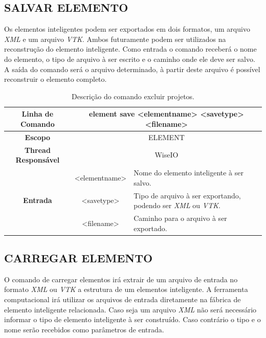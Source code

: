 \subsection{SALVAR ELEMENTO}\label{sec:save_element}

Os elementos inteligentes podem ser exportados em dois formatos, um arquivo \textit{XML} e um arquivo \textit{VTK}. Ambos futuramente podem ser utilizados na reconstrução do elemento inteligente. Como entrada o comando receberá o nome do elemento, o tipo de arquivo à ser escrito e o caminho onde ele deve ser salvo. A saída do comando será o arquivo determinado, à partir deste arquivo é possível reconstruir o elemento completo.

\begin{center}
	\begin{table}[!htbp]
		\begin{tabular}{|c|c|m{}|}
			\hline
			\textbf{Linha de Comando} & \multicolumn{2}{c|}{element save <element\underline{\space\space}name> <save\underline{\space\space}type> <filename>} \\
			\hline
			\textbf{Escopo} & \multicolumn{2}{c|}{ELEMENT} \\
			\hline
			\textbf{Thread Responsável} & \multicolumn{2}{c|}{WiseIO} \\
			\hline
			\multirow{3}{*}{\textbf{Entrada}} & <element\underline{\space\space}name> & Nome do elemento inteligente à ser salvo. \\
			& <save\underline{\space\space}type> & Tipo de arquivo à ser exportando, podendo ser \textit{XML} ou \textit{VTK}. \\
			& <filename> & Caminho para o arquivo à ser exportado. \\
			\hline
		\end{tabular}
		\caption{Descrição do comando excluir projetos.}
		\label{tab:save_element}
	\end{table}
\end{center}

\subsection{CARREGAR ELEMENTO}\label{sec:load_element}

O comando de carregar elementos irá extrair de um arquivo de entrada no formato \textit{XML} ou \textit{VTK} a estrutura de um elementos inteligente. A ferramenta computacional irá utilizar os arquivos de entrada diretamente na fábrica de elemento inteligente relacionada. Caso seja um arquivo \textit{XML} não será necessário informar o tipo de elemento inteligente à ser construído. Caso contrário o tipo e o nome serão recebidos como parâmetros de entrada.

